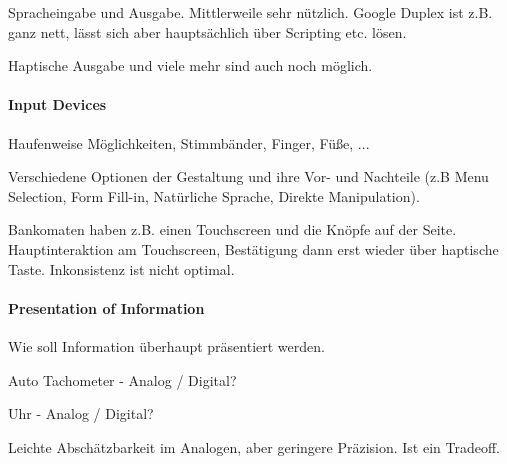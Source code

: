 Spracheingabe und Ausgabe. Mittlerweile sehr nützlich. Google Duplex ist z.B. ganz nett,
lässt sich aber hauptsächlich über Scripting etc. lösen.

Haptische Ausgabe und viele mehr sind auch noch möglich.

\paragraph{Input Devices}
Haufenweise Möglichkeiten, Stimmbänder, Finger, Füße, ...

Verschiedene Optionen der Gestaltung und ihre Vor- und Nachteile (z.B Menu Selection, Form
Fill-in, Natürliche Sprache, Direkte Manipulation).

Bankomaten haben z.B. einen Touchscreen und die Knöpfe auf der Seite. Hauptinteraktion am
Touchscreen, Bestätigung dann erst wieder über haptische Taste. Inkonsistenz ist nicht
optimal. 

\paragraph{Presentation of Information}

Wie soll Information überhaupt präsentiert werden.

Auto Tachometer - Analog / Digital?

Uhr - Analog / Digital?

Leichte Abschätzbarkeit im Analogen, aber geringere Präzision. Ist ein Tradeoff. 


